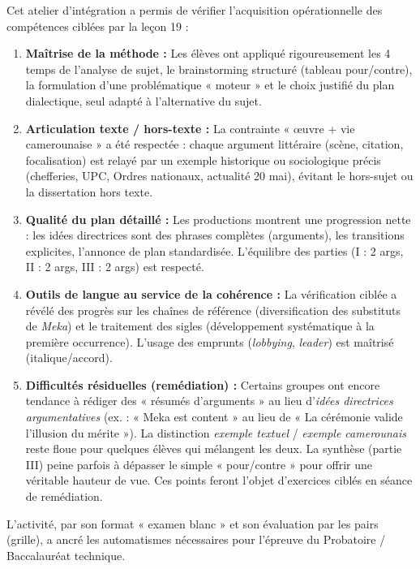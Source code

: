 \documentclass[11pt]{article}
\newcounter{popsec}
\newcounter{popsub}
\newcommand{\courssub}[1]{%
  \stepcounter{popsub}%
  \par\vspace{9pt}\noindent{\popxbold\fontsize{11.5}{13}\selectfont\color{popink}{\color{poporange}\thepopsec.\thepopsub}\hspace{6pt}#1}\par\nopagebreak\vspace{4pt}
}
\begin{document}
\courssub{Bilan de l'activité}
Cet atelier d'intégration a permis de vérifier l'acquisition opérationnelle des compétences ciblées par la leçon 19 :
\begin{enumerate}
    \item \textbf{Maîtrise de la méthode :} Les élèves ont appliqué rigoureusement les 4 temps de l'analyse de sujet, le brainstorming structuré (tableau pour/contre), la formulation d'une problématique « moteur » et le choix justifié du plan dialectique, seul adapté à l'alternative du sujet.
    \item \textbf{Articulation texte / hors-texte :} La contrainte « œuvre + vie camerounaise » a été respectée : chaque argument littéraire (scène, citation, focalisation) est relayé par un exemple historique ou sociologique précis (chefferies, UPC, Ordres nationaux, actualité 20 mai), évitant le hors-sujet ou la dissertation hors texte.
    \item \textbf{Qualité du plan détaillé :} Les productions montrent une progression nette : les idées directrices sont des phrases complètes (arguments), les transitions explicites, l'annonce de plan standardisée. L'équilibre des parties (I : 2 args, II : 2 args, III : 2 args) est respecté.
    \item \textbf{Outils de langue au service de la cohérence :} La vérification ciblée a révélé des progrès sur les chaînes de référence (diversification des substituts de \emph{Meka}) et le traitement des sigles (développement systématique à la première occurrence). L'usage des emprunts (\emph{lobbying}, \emph{leader}) est maîtrisé (italique/accord).
    \item \textbf{Difficultés résiduelles (remédiation) :} Certains groupes ont encore tendance à rédiger des « résumés d'arguments » au lieu d'\emph{idées directrices argumentatives} (ex. : « Meka est content » au lieu de « La cérémonie valide l'illusion du mérite »). La distinction \emph{exemple textuel} / \emph{exemple camerounais} reste floue pour quelques élèves qui mélangent les deux. La synthèse (partie III) peine parfois à dépasser le simple « pour/contre » pour offrir une véritable hauteur de vue. Ces points feront l'objet d'exercices ciblés en séance de remédiation.
\end{enumerate}
L'activité, par son format « examen blanc » et son évaluation par les pairs (grille), a ancré les automatismes nécessaires pour l'épreuve du Probatoire / Baccalauréat technique.

\newpage
\end{document}
